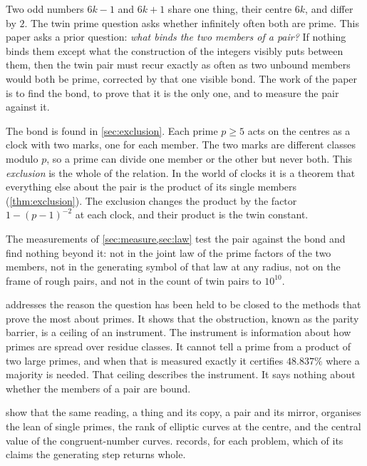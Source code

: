 \documentclass[11pt]{article}
\theoremstyle{definition}\newtheorem{definition}[theorem]{Definition}
\theoremstyle{remark}\newtheorem{remark}[theorem]{Remark}
\begin{document}
Two odd numbers $6k-1$ and $6k+1$ share one thing, their centre $6k$, and differ by $2$. The twin prime question asks whether infinitely often both are prime. This paper asks a prior question: \emph{what binds the two members of a pair?} If nothing binds them except what the construction of the integers visibly puts between them, then the twin pair must recur exactly as often as two unbound members would both be prime, corrected by that one visible bond. The work of the paper is to find the bond, to prove that it is the only one, and to measure the pair against it.

The bond is found in \cref{sec:exclusion}. Each prime $p\ge5$ acts on the centres as a clock with two marks, one for each member. The two marks are different classes modulo $p$, so a prime can divide one member or the other but never both. This \emph{exclusion} is the whole of the relation. In the world of clocks it is a theorem that everything else about the pair is the product of its single members (\cref{thm:exclusion}). The exclusion changes the product by the factor $1-(p-1)^{-2}$ at each clock, and their product is the twin constant.

The measurements of \cref{sec:measure,sec:law} test the pair against the bond and find nothing beyond it: not in the joint law of the prime factors of the two members, not in the generating symbol of that law at any radius, not on the frame of rough pairs, and not in the count of twin pairs to $10^{10}$.

 addresses the reason the question has been held to be closed to the methods that prove the most about primes. It shows that the obstruction, known as the parity barrier, is a ceiling of an instrument. The instrument is information about how primes are spread over residue classes. It cannot tell a prime from a product of two large primes, and when that is measured exactly it certifies $48.837\%$ where a majority is needed. That ceiling describes the instrument. It says nothing about whether the members of a pair are bound.

 show that the same reading, a thing and its copy, a pair and its mirror, organises the lean of single primes, the rank of elliptic curves at the centre, and the central value of the congruent-number curves.  records, for each problem, which of its claims the generating step returns whole.
\end{document}
